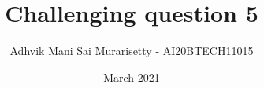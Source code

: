 \documentclass[journal,12pt,twocolumn]{IEEEtran}
\date{March 2021}
\DeclareMathOperator*{\Res}{Res}
\begin{document}
\newcommand{\BEQA}{\begin{eqnarray}}
\newcommand{\EEQA}{\end{eqnarray}}
\newcommand{\define}{\stackrel{\triangle}{=}}

\raggedbottom
\setlength{\parindent}{0pt}
\providecommand{\mbf}{\mathbf}
\providecommand{\pr}[1]{\ensuremath{\Pr\left(#1\right)}}
\providecommand{\qfunc}[1]{\ensuremath{Q\left(#1\right)}}
\providecommand{\fn}[1]{\ensuremath{f\left({#1}\right)}}
\providecommand{\e}[1]{\ensuremath{E\left(#1\right)}}
\providecommand{\sbrak}[1]{\ensuremath{{}\left[#1\right]}}
\providecommand{\lsbrak}[1]{\ensuremath{{}\left[#1\right.}}
\providecommand{\rsbrak}[1]{\ensuremath{{}\left.#1\right]}}
\providecommand{\brak}[1]{\ensuremath{\left(#1\right)}}
\providecommand{\lbrak}[1]{\ensuremath{\left(#1\right.}}
\providecommand{\rbrak}[1]{\ensuremath{\left.#1\right)}}
\providecommand{\cbrak}[1]{\ensuremath{\left\{#1\right\}}}
\providecommand{\lcbrak}[1]{\ensuremath{\left\{#1\right.}}
\providecommand{\rcbrak}[1]{\ensuremath{\left.#1\right\}}}
\theoremstyle{remark}
\newtheorem{rem}{Remark}
\newcommand{\sgn}{\mathop{\mathrm{sgn}}}
\newcommand{\comb}[2]{{}^{#1}\mathrm{C}_{#2}}
\providecommand{\abs}[1]{\vert#1\vert}
\providecommand{\res}[1]{\Res\displaylimits_{#1}} 
\providecommand{\norm}[1]{\lVert#1\rVert}
\providecommand{\mtx}[1]{\mathbf{#1}}
\providecommand{\mean}[1]{E\sbrak{ #1 }}
\providecommand{\fourier}{\overset{\mathcal{F}}{ \rightleftharpoons}}
\providecommand{\system}{\overset{\mathcal{H}}{ \longleftrightarrow}}
\newcommand{\solution}{\noindent \textbf{Solution: }}
\newcommand{\cosec}{\,\text{cosec}\,}
\providecommand{\dec}[2]{\ensuremath{\overset{#1}{\underset{#2}{\gtrless}}}}
\newcommand{\myvec}[1]{\ensuremath{\begin{pmatrix}#1\end{pmatrix}}}
\newcommand{\mydet}[1]{\ensuremath{\begin{vmatrix}#1\end{vmatrix}}}
\makeatletter
\vspace{3cm}
\title{Challenging question 5}
\author{Adhvik Mani Sai Murarisetty - AI20BTECH11015}
\maketitle
\newpage
\bigskip
\renewcommand{\thetable}{\theenumi}
\end{document}
